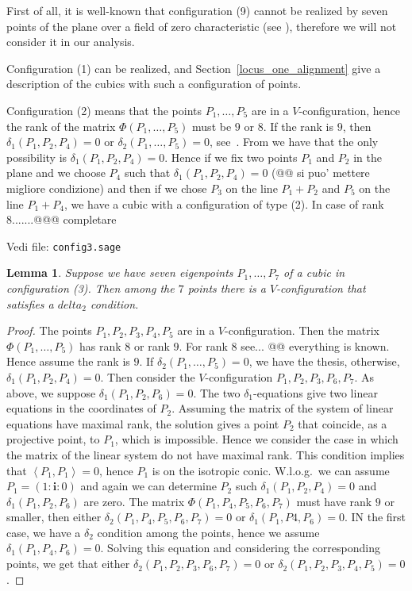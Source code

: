 \documentclass[11pt, a4paper, reqno, captions=tableheading,bibliography=totoc]{scrartcl}
\theoremstyle{plain}
\newtheorem{lemma}{Lemma}[section]
\theoremstyle{definition}
\newcommand{\scl}[2]{\left\langle {#1}, {#2} \right\rangle}
\newcommand{\iii}{\textbf{i}}
\begin{document}
First of all, it is well-known that configuration (9) cannot be realized
by seven points of the plane over a field of zero
characteristic (see \cite{Whitney1935}), therefore we will not consider
it in our analysis.

Configuration (1) can be realized,
 and Section~\ref{locus_one_alignment}
give a description of the cubics with such a configuration of points.

Configuration (2) means that the points $P_1, \dots, P_5$ are in a
$V$-configuration, hence the rank of the matrix $\Phi(P_1, \dots, P_5)$
must be $9$ or $8$. If the rank is $9$, then $\delta_1(P_1, P_2, P_4) = 0$
or $\delta_2(P_1, \dots, P_5) = 0$, see~.
From  we have that the only possibility
is $\delta_1(P_1, P_2, P_4) = 0$. Hence if we fix two points $P_1$ and $P_2$
in the plane and we choose $P_4$ such that $\delta_1(P_1, P_2, P_4) = 0$
(@@ si puo' mettere migliore condizione) and then if we chose $P_3$
on the line $P_1+P_2$ and $P_5$ on the line $P_1+P_4$, we have a cubic
with a configuration of type (2). In case of rank 8.......@@@ completare

Vedi file: \verb+config3.sage+
\begin{lemma}
\label{no_delta1_delta1} Suppose we have  seven eigenpoints $P_1, \dots, P_7$
of a cubic in configuration (3). Then among the $7$ points there is a
$V$-configuration that satisfies a $delta_2$ condition.
\end{lemma}
\begin{proof}
The points $P_1, P_2, P_3, P_4, P_5$ are in a $V$-configuration. Then 
the matrix $\Phi(P_1, \dots, P_5)$ has rank $8$ or rank $9$. For rank $8$
see... @@ everything is known. Hence assume the rank is $9$. If
$\delta_2(P_1, \dots, P_5) = 0$, we have the thesis, otherwise,
$\delta_1(P_1, P_2, P_4) = 0$. Then consider the $V$-configuration
$P_1, P_2, P_3, P_6, P_7$. As above, we suppose $\delta_1(P_1, P_2, P_6) = 0$.
The two $\delta_1$-equations give two linear equations in the coordinates
of $P_2$. Assuming the matrix of the system of linear equations have
maximal rank, the solution gives a point $P_2$ that coincide, as
a projective point, to $P_1$, which is impossible. Hence we consider the
case in which the matrix of the linear system do not have maximal rank.
This condition implies that $\scl{P_1}{P_1} = 0$, hence $P_1$ is on the
isotropic conic. W.l.o.g.\ we can assume $P_1 = (1: \iii: 0)$ and again 
we can determine $P_2$ such $\delta_1(P_1, P_2, P_4) = 0$ and
$\delta_1(P_1, P_2, P_6)$ are zero. The matrix $\Phi(P_1, P_4, P_5, P_6, P_7)$
must have rank $9$ or smaller, then either
$\delta_2(P_1, P_4, P_5, P_6, P_7)=0$ or $\delta_1(P_1, P4, P_6) = 0$. IN
the first case, we have a $\delta_2$ condition among the points, hence
we assume $\delta_1(P_1, P_4, P_6) = 0$. Solving this equation and
considering the corresponding points, we get that either
$\delta_2(P_1, P_2, P_3, P_6, P_7) = 0$ or
$\delta_2(P_1, P_2, P_3, P_4, P_5)=0$.
\end{proof}
\end{document}
